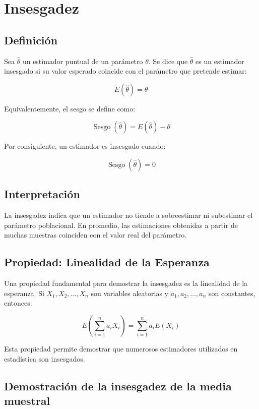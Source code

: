 \documentclass[
  11pt,
]{report}
\author{}
\date{\vspace{-2.5em}}
\begin{document}
{
\setcounter{tocdepth}{2}
\tableofcontents
}
\section{Insesgadez}\label{insesgadez}

\subsection{Definición}\label{definiciuxf3n}

Sea \(\hat{\theta}\) un estimador puntual de un parámetro \(\theta\). Se
dice que \(\hat{\theta}\) es un estimador insesgado si su valor esperado
coincide con el parámetro que pretende estimar:

\[E(\hat{\theta})=\theta\]

Equivalentemente, el sesgo se define como:

\[\operatorname{Sesgo}(\hat{\theta})
=
E(\hat{\theta})-\theta\]

Por consiguiente, un estimador es insesgado cuando:

\[\operatorname{Sesgo}(\hat{\theta})=0\]

\subsection{Interpretación}\label{interpretaciuxf3n}

La insesgadez indica que un estimador no tiende a sobreestimar ni
subestimar el parámetro poblacional. En promedio, las estimaciones
obtenidas a partir de muchas muestras coinciden con el valor real del
parámetro.

\subsection{Propiedad: Linealidad de la
Esperanza}\label{propiedad-linealidad-de-la-esperanza}

Una propiedad fundamental para demostrar la insesgadez es la linealidad
de la esperanza. Si \(X_1,X_2,\ldots,X_n\) son variables aleatorias y
\(a_1,a_2,\ldots,a_n\) son constantes, entonces:

\[E\left(
\sum_{i=1}^{n} a_i X_i
\right)
=
\sum_{i=1}^{n}
a_i E(X_i)\]

Esta propiedad permite demostrar que numerosos estimadores utilizados en
estadística son insesgados.

\subsection{Demostración de la insesgadez de la media
muestral}\label{demostraciuxf3n-de-la-insesgadez-de-la-media-muestral}
\end{document}
